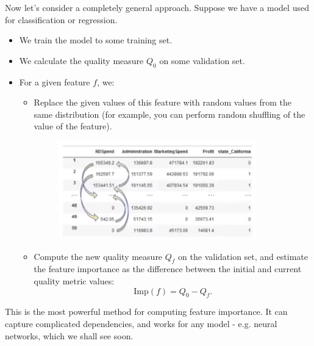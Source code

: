 \newpage
Now let's consider a completely general approach. Suppose we have a model used for classification or regression.
\begin{itemize}
\item We train the model to some training set.
\item We calculate the quality measure $Q_0$ on some validation set.
\item For a given feature $f$, we:
\begin{itemize}
\item Replace the given values of this feature with random values from the same distribution (for example, you can perform random shuffling of the value of the feature). 
\begin{figure}[H]
\centering
\includegraphics[scale=0.4]{randomshuffle.png}
\end{figure}
\item Compute the new quality measure $Q_f$ on the validation set, and estimate the feature importance as the difference between the initial and current quality metric values:
\begin{equation*}
\textrm{Imp}(f) = Q_0 - Q_f.
\end{equation*}
\end{itemize}
\end{itemize}

This is the most powerful method for computing feature importance. It can capture complicated dependencies, and works for any model - e.g. neural networks, which we shall see soon.\\


